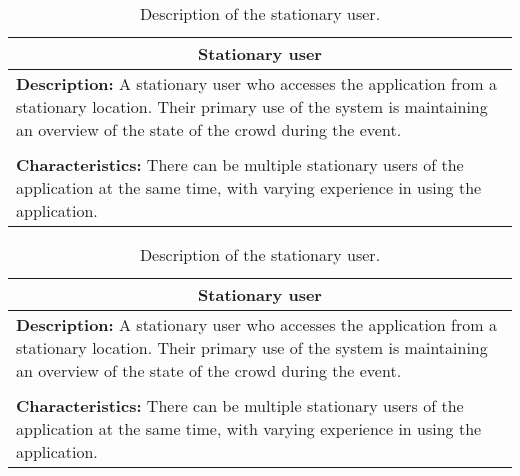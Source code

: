 \begin{table}[h!]
    \centering
    \begin{tabularx}{/4}{X}
        \toprule
        \multicolumn{1}{c}{\textbf{Stationary user}} \\ 
        \midrule
        \textbf{Description:} A stationary user who accesses the application from a stationary location. Their primary use of the system is maintaining an overview of the state of the crowd during the event. \\
        \\
        \textbf{Characteristics:} There can be multiple stationary users of the application at the same time, with varying experience in using the application. \\
        \bottomrule
    \end{tabularx}
    \caption{Description of the stationary user.}
    \label{tab:stat_user}
\end{table}

\begin{table}[h!]
    \centering
    \begin{tabularx}{/4}{X}
        \toprule
        \multicolumn{1}{c}{\textbf{Stationary user}} \\ 
        \midrule
        \textbf{Description:} A stationary user who accesses the application from a stationary location. Their primary use of the system is maintaining an overview of the state of the crowd during the event. \\
        \\
        \textbf{Characteristics:} There can be multiple stationary users of the application at the same time, with varying experience in using the application. \\
        \bottomrule
    \end{tabularx}
    \caption{Description of the stationary user.}
    \label{tab:stat_user}
\end{table}